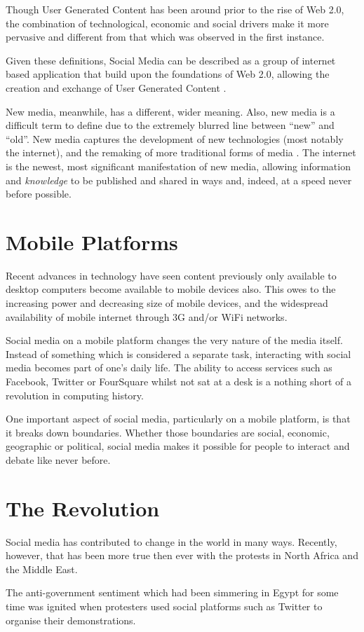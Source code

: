 \documentclass[a4paper,11pt]{article}
\begin{document}
    Though User Generated Content has been around prior to the rise of Web 2.0,
    the combination of technological, economic and social drivers make it more
    pervasive and different from that which was observed in the first instance.

    Given these definitions, Social Media can be described as a group of
    internet based application that build upon the foundations of Web 2.0,
    allowing the creation and exchange of User Generated Content
    \cite{kaplan2010}.

    New media, meanwhile, has a different, wider meaning. Also, new media is
    a difficult term to define due to the extremely blurred line between
    ``new'' and ``old''. New media captures the development of new technologies
    (most notably the internet), and the remaking of more traditional forms of
    media \cite{flew2008}. The internet is the newest, most significant
    manifestation of new media, allowing information and \emph{knowledge} to be
    published and shared in ways and, indeed, at a speed never before
    possible.

    \section{Mobile Platforms}

    Recent advances in technology have seen content previously only available
    to desktop computers become available to mobile devices also. This owes to
    the increasing power and decreasing size of mobile devices, and the
    widespread availability of mobile internet through 3G and/or WiFi networks.

    Social media on a mobile platform changes the very nature of the media
    itself. Instead of something which is considered a separate task,
    interacting with social media becomes part of one's daily life. The ability
    to access services such as Facebook, Twitter or FourSquare whilst not sat
    at a desk is a nothing short of a revolution in computing history.

    One important aspect of social media, particularly on a mobile platform, is
    that it breaks down boundaries. Whether those boundaries are social,
    economic, geographic or political, social media makes it possible for
    people to interact and debate like never before.

    \section{The Revolution}

    Social media has contributed to change in the world in many ways. Recently,
    however, that has been more true then ever with the protests in North
    Africa and the Middle East.

    The anti-government sentiment which had been simmering in Egypt for some
    time was ignited when protesters used social platforms such as Twitter to
    organise their demonstrations.

    
    
\end{document}
